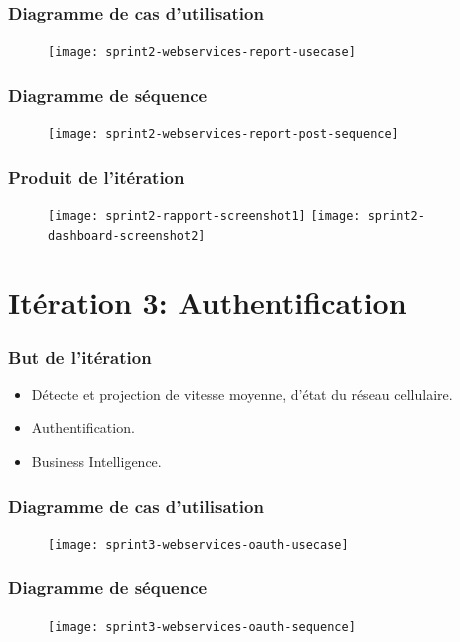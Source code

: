 \documentclass{beamer}
\begin{document}
\begin{frame}
    \frametitle{Diagramme de cas d'utilisation}
    \begin{figure}
        \texttt{[image: sprint2-webservices-report-usecase]}
    \end{figure}
\end{frame}

\begin{frame}
    \frametitle{Diagramme de séquence}
    \begin{figure}
        \texttt{[image: sprint2-webservices-report-post-sequence]}
    \end{figure}
\end{frame}

\begin{frame}
    \frametitle{Produit de l'itération}
    \begin{figure}
        \texttt{[image: sprint2-rapport-screenshot1]}
        \texttt{[image: sprint2-dashboard-screenshot2]}
    \end{figure}
\end{frame}

\section{Itération 3: Authentification}

\begin{frame}
    \frametitle{But de l'itération}
    \begin{itemize}
        \item<1-> Détecte et projection de vitesse moyenne, d'état du réseau cellulaire.
        \item<2-> Authentification.
        \item<3-> Business Intelligence.
    \end{itemize}
\end{frame}

\begin{frame}
    \frametitle{Diagramme de cas d'utilisation}
    \begin{figure}
        \texttt{[image: sprint3-webservices-oauth-usecase]}
    \end{figure}
\end{frame}

\begin{frame}
    \frametitle{Diagramme de séquence}
    \begin{figure}
        \texttt{[image: sprint3-webservices-oauth-sequence]}
    \end{figure}
\end{frame}
\end{document}
